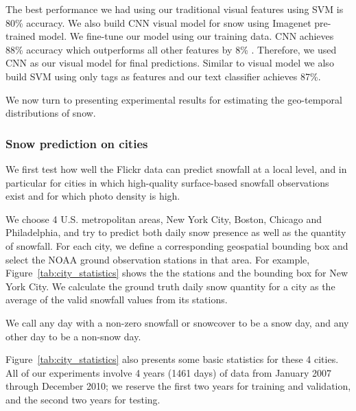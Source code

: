 The best performance we had using our traditional visual features using SVM is 80\% accuracy.  We also build CNN visual model for snow using Imagenet pre-trained model. We fine-tune our model using our training data. CNN  achieves 88\% accuracy which  outperforms all other features by 8\% . Therefore, we used CNN as our visual model for final predictions.  Similar to visual model we also build SVM using only tags as features and our text classifier achieves 87\%.




We now turn to presenting experimental results for estimating the
geo-temporal distributions of snow.

\subsubsection{Snow prediction on cities}


We first test how well the Flickr data can predict snowfall at a local
level, and in particular for cities in which high-quality
surface-based snowfall observations exist and for which photo density is high.

We choose 4 U.S. metropolitan areas, New York City, Boston, Chicago and
Philadelphia, and try to predict both daily snow presence as well as
the quantity of snowfall.  For each city, we define a corresponding
geospatial bounding box and select the NOAA ground observation stations in that area. 
For example, 
Figure~\ref{tab:city_statistics} shows the the stations 
and the bounding box for 
New York City. We calculate the ground truth daily snow quantity for a city as the average of
the valid 
snowfall values from its stations.

We call any day with a non-zero snowfall or snowcover to be a snow day,
and any other day to be a non-snow day.

Figure~\ref{tab:city_statistics} also presents some basic statistics for
these 4 cities.  All of our experiments involve 4 years (1461 days) of
data from January 2007 through December 2010; we reserve the first two
years for training and validation, and the second two years for
testing.


